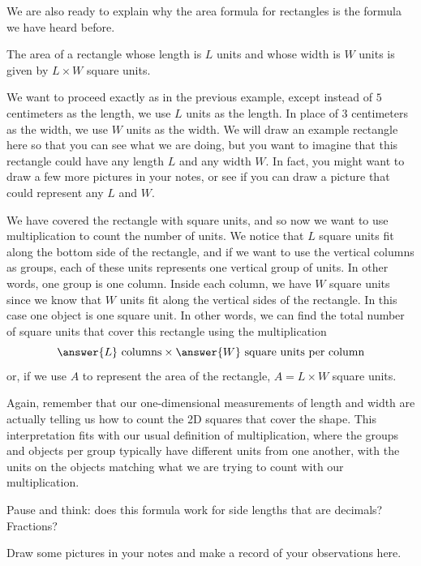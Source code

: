 \documentclass{ximera}
\begin{document}
We are also ready to explain why the area formula for rectangles is the formula we have heard before.
\begin{theorem}
The area of a rectangle whose length is $L$ units and whose width is $W$ units is given by $L \times W$ square units.
\end{theorem}
\begin{explanation}
We want to proceed exactly as in the previous example, except instead of $5$ centimeters as the length, we use $L$ units as the length. In place of $3$ centimeters as the width, we use $W$ units as the width. We will draw an example rectangle here so that you can see what we are doing, but you want to imagine that this rectangle could have any length $L$ and any width $W$. In fact, you might want to draw a few more pictures in your notes, or see if you can draw a picture that could represent any $L$ and $W$.
\begin{image}\end{image}
We have covered the rectangle with square units, and so now we want to use multiplication to count the number of units. We notice that $L$ square units fit along the bottom side of the rectangle, and if we want to use the vertical columns as groups, each of these units represents one vertical group of units. In other words, one group is one column. Inside each column, we have $W$ square units since we know that $W$ units fit along the vertical sides of the rectangle. In this case one object is one square unit. In other words, we can find the total number of square units that cover this rectangle using the multiplication
\[
\answer{L} \textrm{ columns} \times \answer{W} \textrm{ square units per column}
\]
or, if we use $A$ to represent the area of the rectangle, $A = L \times W$ square units.
\end{explanation}
Again, remember that our one-dimensional measurements of length and width are actually telling us how to count the 2D squares that cover the shape. This interpretation fits with our usual definition of multiplication, where the groups and objects per group typically have different units from one another, with the units on the objects matching what we are trying to count with our multiplication.

\begin{question}
Pause and think: does this formula work for side lengths that are decimals? Fractions?
\begin{freeResponse}
Draw some pictures in your notes and make a record of your observations here.
\end{freeResponse}
\end{question}
\end{document}
